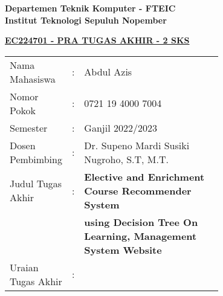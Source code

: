 \begin{flushleft}
  \textbf{Departemen Teknik Komputer - FTEIC}\\
  \textbf{Institut Teknologi Sepuluh Nopember}\\
\end{flushleft}

\begin{center}
  \underline{\textbf{EC224701 - PRA TUGAS AKHIR - 2 SKS}}
\end{center}

\begin{adjustwidth}{-0.2cm}{}
  \begin{tabular}{lcp{0.7\linewidth}}

    Nama Mahasiswa     & : & Abdul Azis                                                          \\
    Nomor Pokok        & : & 0721 19 4000 7004                                                   \\

    Semester           & : & Ganjil 2022/2023                                                    \\

    Dosen Pembimbing   & : & Dr. Supeno Mardi Susiki Nugroho, S.T, M.T.                          \\
    Judul Tugas Akhir  & : & \textbf{Elective and Enrichment Course Recommender System}          \\
                       &   & \textbf{using Decision Tree On Learning, Management System Website} \\

    Uraian Tugas Akhir & : &                                                                     \\
  \end{tabular}
\end{adjustwidth}

